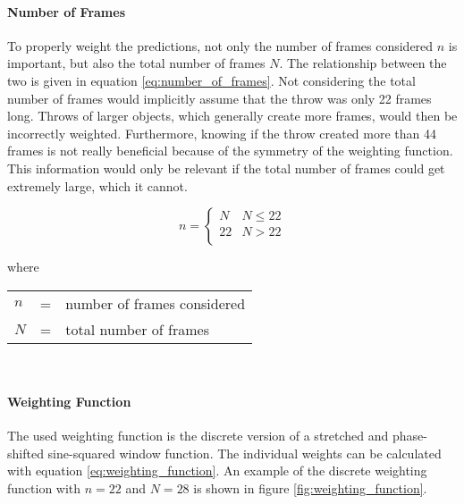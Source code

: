 \paragraph{Number of Frames}
To properly weight the predictions, not only the number of frames considered $n$ is important, but also the total number of frames $N$.
The relationship between the two is given in equation \ref{eq:number_of_frames}.
Not considering the total number of frames would implicitly assume that the throw was only \num{22} frames long.
Throws of larger objects, which generally create more frames, would then be incorrectly weighted.
Furthermore, knowing if the throw created more than \num{44} frames is not really beneficial because of the symmetry of the weighting function.
This information would only be relevant if the total number of frames could get extremely large, which it cannot.

\begin{equation}
  n =
  \begin{cases}
    N & N \leq 22 \\
    22 & N > 22 \\
  \end{cases}
  \label{eq:number_of_frames}
\end{equation}

where

\begin{tabular}{lll}
  $n$ & = & number of frames considered \\
  $N$ & = & total number of frames \\
\end{tabular}
\\

\paragraph{Weighting Function}
The used weighting function is the discrete version of a stretched and phase-shifted sine-squared window function.
The individual weights can be calculated with equation \ref{eq:weighting_function}.
An example of the discrete weighting function with $n = 22$ and $N = 28$ is shown in figure \ref{fig:weighting_function}.

